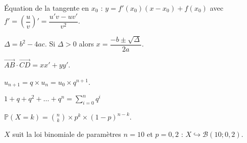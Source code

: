\'Equation de la tangente en $x_0$ :
$y = f'(x_0) \left(x - x_0\right) + f(x_0)$ avec
$f' = \left(\dfrac u v\right)' = \dfrac{u'v - uv'}{v^2}$.\medskip

$\Delta = b^2 - 4ac$. Si $\Delta > 0$ alors
$x = \dfrac{-b \pm \sqrt \Delta}{2a}$.\medskip

$\overrightarrow{AB} \cdot \overrightarrow{CD} = xx' + yy'$.\medskip

$u_{n + 1} = q\times u_n = u_0 \times q^{n+1}$.\medskip

$1 + q + q^2 + \dots + q^n = \sum_{i = 0}^n q^i$\medskip

$\mathds P(X = k) = \binom n k \times p^k \times (1-p)^{n-k}$.\medskip

$X$ suit la loi binomiale de paramètres $n=10$ et $p=0,2$ :
$X \hookrightarrow \mathcal B(10 ; 0,2)$.
